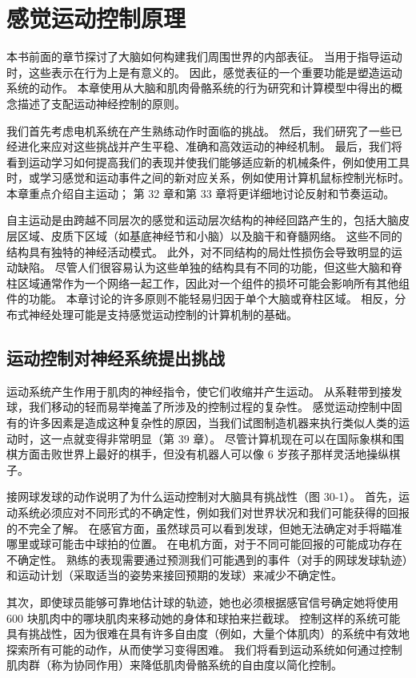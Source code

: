 \chapter{感觉运动控制原理}

本书前面的章节探讨了大脑如何构建我们周围世界的内部表征。 当用于指导运动时，这些表示在行为上是有意义的。 因此，感觉表征的一个重要功能是塑造运动系统的动作。 本章使用从大脑和肌肉骨骼系统的行为研究和计算模型中得出的概念描述了支配运动神经控制的原则。

我们首先考虑电机系统在产生熟练动作时面临的挑战。 然后，我们研究了一些已经进化来应对这些挑战并产生平稳、准确和高效运动的神经机制。 最后，我们将看到运动学习如何提高我们的表现并使我们能够适应新的机械条件，例如使用工具时，或学习感觉和运动事件之间的新对应关系，例如使用计算机鼠标控制光标时。 本章重点介绍自主运动； 第 32 章和第 33 章将更详细地讨论反射和节奏运动。

自主运动是由跨越不同层次的感觉和运动层次结构的神经回路产生的，包括大脑皮层区域、皮质下区域（如基底神经节和小脑）以及脑干和脊髓网络。 这些不同的结构具有独特的神经活动模式。 此外，对不同结构的局灶性损伤会导致明显的运动缺陷。 尽管人们很容易认为这些单独的结构具有不同的功能，但这些大脑和脊柱区域通常作为一个网络一起工作，因此对一个组件的损坏可能会影响所有其他组件的功能。 本章讨论的许多原则不能轻易归因于单个大脑或脊柱区域。 相反，分布式神经处理可能是支持感觉运动控制的计算机制的基础。

\section{运动控制对神经系统提出挑战}

运动系统产生作用于肌肉的神经指令，使它们收缩并产生运动。 从系鞋带到接发球，我们移动的轻而易举掩盖了所涉及的控制过程的复杂性。 感觉运动控制中固有的许多因素是造成这种复杂性的原因，当我们试图制造机器来执行类似人类的运动时，这一点就变得非常明显（第 39 章）。 尽管计算机现在可以在国际象棋和围棋方面击败世界上最好的棋手，但没有机器人可以像 6 岁孩子那样灵活地操纵棋子。

接网球发球的动作说明了为什么运动控制对大脑具有挑战性（图 30-1）。 首先，运动系统必须应对不同形式的不确定性，例如我们对世界状况和我们可能获得的回报的不完全了解。 在感官方面，虽然球员可以看到发球，但她无法确定对手将瞄准哪里或球可能击中球拍的位置。 在电机方面，对于不同可能回报的可能成功存在不确定性。 熟练的表现需要通过预测我们可能遇到的事件（对手的网球发球轨迹）和运动计划（采取适当的姿势来接回预期的发球）来减少不确定性。

其次，即使球员能够可靠地估计球的轨迹，她也必须根据感官信号确定她将使用 600 块肌肉中的哪块肌肉来移动她的身体和球拍来拦截球。 控制这样的系统可能具有挑战性，因为很难在具有许多自由度（例如，大量个体肌肉）的系统中有效地探索所有可能的动作，从而使学习变得困难。 我们将看到运动系统如何通过控制肌肉群（称为协同作用）来降低肌肉骨骼系统的自由度以简化控制。

